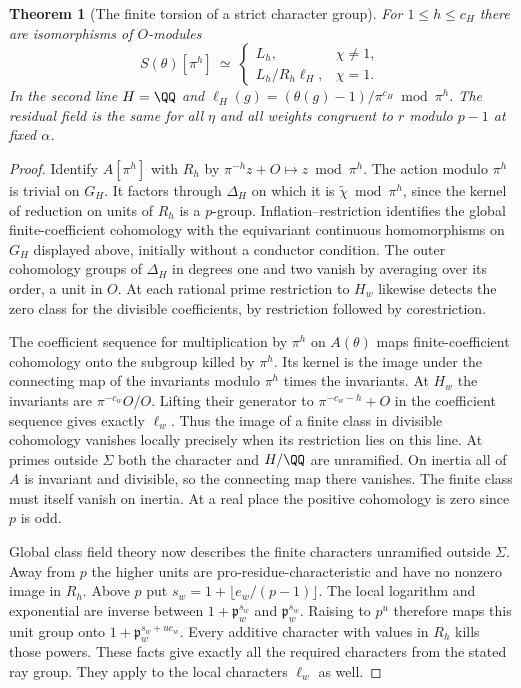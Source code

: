 \documentclass[a4paper,11pt]{article}
\newtheorem{theorem}[proposition]{Theorem}
\theoremstyle{definition}
\theoremstyle{remark}
\numberwithin{equation}{section}
\begin{document}
\begin{theorem}[The finite torsion of a strict character group]
\leavevmode\label{thm:raylength656}
For \(1\le h\le c_H\) there are isomorphisms of \(O\)-modules
\[
 S(\theta)[\pi^h]\ \simeq\
 \begin{cases}
 L_h,&\chi\ne1,\\
 L_h/R_h\ell_H,&\chi=1 .
 \end{cases}
\]
In the second line \(H=\QQ\) and
\(\ell_H(g)=(\theta(g)-1)/\pi^{c_H}\bmod\pi^h\).
The residual field is the same for all \(\eta\) and all weights
congruent to \(r\) modulo \(p-1\) at fixed \(\alpha\).
\end{theorem}
\begin{proof}
Identify \(A[\pi^h]\) with \(R_h\) by
\(\pi^{-h}z+O\mapsto z\bmod\pi^h\). The action modulo \(\pi^h\)
is trivial on \(G_H\). It factors through \(\Delta_H\) on which
it is \(\widetilde\chi\bmod\pi^h\), since the kernel of reduction
on units of \(R_h\) is a \(p\)-group. Inflation--restriction
identifies the global finite-coefficient cohomology with the
equivariant continuous homomorphisms on \(G_H\) displayed above,
initially without a conductor condition. The outer cohomology
groups of \(\Delta_H\) in degrees one and two vanish by averaging
over its order, a unit in \(O\). At each rational prime restriction
to \(H_w\) likewise detects the zero class for the divisible
coefficients, by restriction followed by corestriction.

The coefficient sequence for multiplication by \(\pi^h\) on
\(A(\theta)\) maps finite-coefficient cohomology onto the subgroup
killed by \(\pi^h\). Its kernel is the image under the connecting
map of the invariants modulo \(\pi^h\) times the invariants. At
\(H_w\) the invariants are \(\pi^{-c_w}O/O\). Lifting their
generator to \(\pi^{-c_w-h}+O\) in the coefficient sequence
gives exactly \(\ell_w\). Thus the image of a finite class in
divisible cohomology vanishes locally precisely when its
restriction lies on this line. At primes outside \(\Sigma\)
both the character and \(H/\QQ\) are unramified. On inertia all
of \(A\) is invariant and divisible, so the connecting map there
vanishes. The finite class must itself vanish on inertia.
At a real place the positive cohomology is zero since \(p\) is odd.

Global class field theory now describes the finite characters
unramified outside \(\Sigma\). Away from \(p\) the higher
units are pro-residue-characteristic and have no nonzero image
in \(R_h\). Above \(p\) put \(s_w=1+\lfloor e_w/(p-1)\rfloor\).
The local logarithm and exponential are inverse between
\(1+\mathfrak p_w^{s_w}\) and \(\mathfrak p_w^{s_w}\).
Raising to \(p^u\) therefore maps this unit group onto
\(1+\mathfrak p_w^{s_w+u e_w}\). Every additive character
with values in \(R_h\) kills those powers. These facts give
exactly all the required characters from the stated ray group.
They apply to the local characters \(\ell_w\) as well.


\end{proof}
\end{document}
